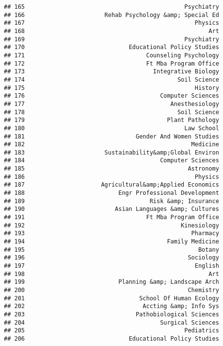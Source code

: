 \documentclass[
]{article}
\begin{document}
\begin{verbatim}
## 165                                              Psychiatry
## 166                       Rehab Psychology &amp; Special Ed
## 167                                                 Physics
## 168                                                     Art
## 169                                              Psychiatry
## 170                              Educational Policy Studies
## 171                                   Counseling Psychology
## 172                                   Ft Mba Program Office
## 173                                     Integrative Biology
## 174                                            Soil Science
## 175                                                 History
## 176                                       Computer Sciences
## 177                                          Anesthesiology
## 178                                            Soil Science
## 179                                         Plant Pathology
## 180                                              Law School
## 181                                Gender And Women Studies
## 182                                                Medicine
## 183                       Sustainability&amp;Global Environ
## 184                                       Computer Sciences
## 185                                               Astronomy
## 186                                                 Physics
## 187                      Agricultural&amp;Applied Economics
## 188                           Engr Professional Development
## 189                                    Risk &amp; Insurance
## 190                          Asian Languages &amp; Cultures
## 191                                   Ft Mba Program Office
## 192                                             Kinesiology
## 193                                                Pharmacy
## 194                                         Family Medicine
## 195                                                  Botany
## 196                                               Sociology
## 197                                                 English
## 198                                                     Art
## 199                           Planning &amp; Landscape Arch
## 200                                               Chemistry
## 201                                 School Of Human Ecology
## 202                                  Accting &amp; Info Sys
## 203                                Pathobiological Sciences
## 204                                       Surgical Sciences
## 205                                              Pediatrics
## 206                              Educational Policy Studies

\end{verbatim}
\end{document}
